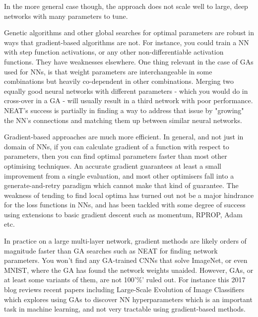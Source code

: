  In the more general case though, the approach does not scale well to large, deep networks with many parameters to tune.

 Genetic algorithms and other global searches for optimal parameters are robust in ways that gradient-based algorithms are not. For instance, you could train a NN with step function activations, or any other non-differentiable activation functions. They have weaknesses elsewhere. One thing relevant in the case of GAs used for NNs, is that weight parameters are interchangeable in some combinations but heavily co-dependent in other combinations. Merging two equally good neural networks with different parameters - which you would do in cross-over in a GA - will usually result in a third network with poor performance. NEAT's success is partially in finding a way to address that issue by "growing" the NN's connections and matching them up between similar neural networks.

 Gradient-based approaches are much more efficient. In general, and not just in domain of NNs, if you can calculate gradient of a function with respect to parameters, then you can find optimal parameters faster than most other optimising techniques. An accurate gradient guarantees at least a small improvement from a single evaluation, and most other optimisers fall into a generate-and-retry paradigm which cannot make that kind of guarantee. The weakness of tending to find local optima has turned out not be a major hindrance for the loss functions in NNs, and has been tackled with some degree of success using extensions to basic gradient descent such as momentum, RPROP, Adam etc.

 In practice on a large multi-layer network, gradient methods are likely orders of magnitude faster than GA searches such as NEAT for finding network parameters. You won't find any GA-trained CNNs that solve ImageNet, or even MNIST, where the GA has found the network weights unaided. However, GAs, or at least some variants of them, are not 100'\%' ruled out. For instance this 2017 blog reviews recent papers including Large-Scale Evolution of Image Classifiers which explores using GAs to discover NN hyperparameters which is an important task in machine learning, and not very tractable using gradient-based methods.
